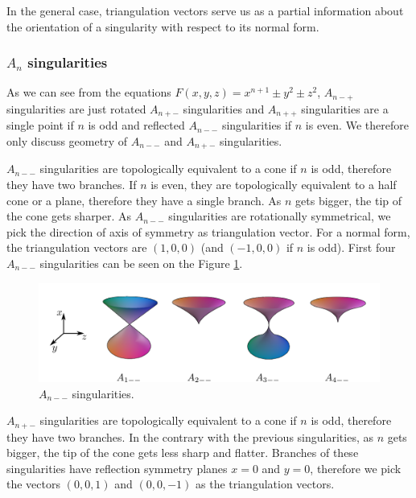 In the general case, triangulation vectors serve us
as a partial information about the orientation of a singularity with 
respect to its normal form.

\subsubsection*{$A_n$ singularities}

As we can see from the equations 
$F(x,y,z)=x^{n+1}\pm y^2\pm z^2$, $A_{n-+}$
singularities are just rotated $A_{n+-}$ singularities and $A_{n++}$ singularities 
are a single point if $n$ is odd and reflected $A_{n--}$ singularities if $n$ is even. 
We therefore only discuss geometry of $A_{n--}$ and $A_{n+-}$ singularities.

$A_{n--}$ singularities are topologically equivalent to a cone if $n$ is odd, therefore
they have two branches.
If $n$ is even, they are topologically equivalent to a half cone or a plane, therefore
they have a single branch.
As $n$ gets bigger, the tip of the cone gets sharper. As $A_{n--}$ singularities
are rotationally symmetrical, we pick the direction of
axis of symmetry as triangulation vector. For a normal form, the triangulation vectors
are $(1, 0, 0)$ (and $(-1, 0, 0)$ if $n$ is odd).
First four $A_{n--}$ singularities can be seen on the Figure \ref{img:4}.

\begin{figure}
    \centerline{\includegraphics[scale=0.5]{images/img4}}
    \caption[$A_{n--}$ singularities]
    {$A_{n--}$ singularities. \cite{singsurf}}
    \label{img:4}
\end{figure}


$A_{n+-}$ singularities are topologically equivalent to a cone if $n$ is odd, therefore
they have two branches.
In the contrary with the previous singularities, as $n$ gets bigger, the tip
of the cone gets less sharp and flatter. Branches of these singularities have 
reflection symmetry planes $x=0$ and $y=0$, therefore we pick the vectors
$(0, 0, 1)$ and $(0, 0, -1)$ as the triangulation vectors.

